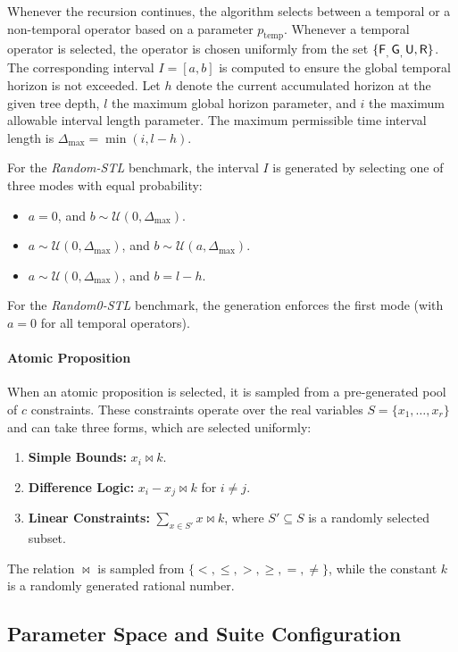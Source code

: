 \documentclass{easychair}
\begin{document}
Whenever the recursion continues, the algorithm selects between a temporal or a non-temporal operator based on a parameter $p_{\text{temp}}$.
%
Whenever a temporal operator is selected, the operator is chosen uniformly from the set $\{ \mathop{\mathsf{\mathsf{F}}^{{}}_{,}} \mathop{\mathsf{\mathsf{G}}^{{}}_{,}} \mathsf{U}, \mathsf{R} \}$. The corresponding interval $I = [a,b]$ is computed to ensure the global temporal horizon is not exceeded. Let $h$ denote the current accumulated horizon at the given tree depth, $l$ the maximum global horizon parameter, and $i$ the maximum allowable interval length parameter. The maximum permissible time interval length is $\Delta_{\max} = \min(i, l - h)$.

For the \emph{Random-STL} benchmark, the interval $I$ is generated by selecting one of three modes with equal probability:
\begin{itemize}
    \item $a = 0$, and $b \sim \mathcal{U}(0, \Delta_{\max})$.
    \item $a \sim \mathcal{U}(0, \Delta_{\max})$, and $b \sim \mathcal{U}(a, \Delta_{\max})$.
    \item $a \sim \mathcal{U}(0, \Delta_{\max})$, and $b = l - h$.
\end{itemize}
%
For the \emph{Random0-STL} benchmark, the generation enforces the first mode (with $a = 0$ for all temporal operators).

\paragraph{Atomic Proposition}

When an atomic proposition is selected, it is sampled from a pre-generated pool of $c$ constraints. These constraints operate over the real variables $S = \{x_1, \dots, x_r\}$ and can take three forms, which are selected uniformly:
\begin{enumerate}
    \item \textbf{Simple Bounds:} $x_i \bowtie k$.
    \item \textbf{Difference Logic:} $x_i - x_j \bowtie k$ for $i \neq j$.
    \item \textbf{Linear Constraints:} $\sum_{x \in S'} x \bowtie k$, where $S' \subseteq S$ is a randomly selected subset.
\end{enumerate}
The relation $\bowtie$ is sampled from $\{<, \leq, >, \geq, =, \neq\}$, while the constant $k$ is a randomly generated rational number.

\subsection{Parameter Space and Suite Configuration}
\end{document}
